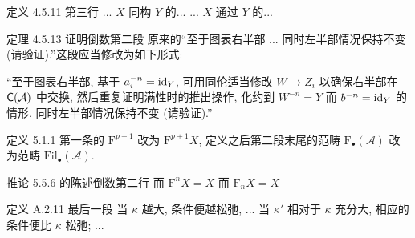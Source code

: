 \documentclass{AJerrata}
\begin{document}
\begin{Errata}
		\item[定义 4.5.11 第三行]
		\Orig ... $X$ 同构 $Y$ 的...
		\Corr ... $X$ 通过 $Y$ 的...
		
		\item[定理 4.5.13 证明倒数第二段]
		原来的``至于图表右半部 ... 同时左半部情况保持不变 (请验证).''这段应当修改为如下形式:
		
		``至于图表右半部, 基于 $a_i^{-n} = \mathrm{id}_Y$, 可用同伦适当修改 $W \to Z_i$ 以确保右半部在 $\mathsf{C}(\mathcal{A})$ 中交换, 然后重复证明满性时的推出操作, 化约到 $W^{-n} = Y$ 而 $b^{-n} = \mathrm{id}_Y$ 的情形, 同时左半部情况保持不变 (请验证).''
		
		\item[定义 5.1.1]
		第一条的 $\mathrm{F}^{p+1}$ 改为 $\mathrm{F}^{p+1} X$, 定义之后第二段末尾的范畴 $\mathrm{F}_{\bullet}(\mathcal{A})$ 改为范畴 $\mathrm{Fil}_{\bullet}(\mathcal{A})$.
		
		\item[推论 5.5.6 的陈述倒数第二行]
		\Orig 而 $\mathrm{F}^n X = X$
		\Corr 而 $\mathrm{F}_n X = X$
		
		\item[定义 A.2.11 最后一段]
		\Orig 当 $\kappa$ 越大, 条件便越松弛, ...
		\Corr 当 $\kappa'$ 相对于 $\kappa$ 充分大, 相应的条件便比 $\kappa$ 松弛; ...
	\end{Errata}
\end{document}
